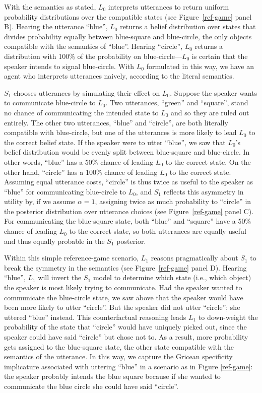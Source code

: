 \documentclass[10pt,letterpaper]{article}
\begin{document}
With the semantics as stated, $L_0$ interprets utterances to return uniform probability distributions over the compatible states (see Figure~\ref{ref-game} panel B). Hearing the utterance ``blue'', $L_0$ returns a belief distribution over states that divides probability equally between blue-square and blue-circle, the only objects compatible with the semantics of ``blue''. Hearing ``circle'', $L_0$ returns a distribution with 100\% of the probability on blue-circle---$L_0$ is certain that the speaker intends to signal blue-circle. With $L_0$ formulated in this way, we have an agent who interprets utterances naively, according to the literal semantics.

$S_1$ chooses utterances by simulating their effect on $L_0$. Suppose the speaker wants to communicate blue-circle to $L_0$. Two utterances, ``green'' and ``square'', stand no chance of communicating the intended state to $L_0$ and so they are ruled out entirely. The other two utterances, ``blue'' and ``circle'', are both literally compatible with blue-circle, but one of the utterances is more likely to lead $L_0$ to the correct belief state. If the speaker were to utter ``blue'', we saw that $L_0$'s belief distribution would be evenly split between blue-square and blue-circle. In other words, ``blue'' has a 50\% chance of leading $L_0$ to the correct state. On the other hand, ``circle'' has a 100\% chance of leading $L_0$ to the correct state. Assuming equal utterance costs, ``circle'' is thus twice as useful to the speaker as ``blue'' for communicating blue-circle to $L_0$, and $S_1$ reflects this asymmetry in utility by, if we assume $\alpha=1$, assigning twice as much probability to ``circle'' in the posterior distribution over utterance choices (see Figure~\ref{ref-game} panel C). For communicating the blue-square state, both ``blue'' and ``square'' have a 50\% chance of leading $L_0$ to the correct state, so both utterances are equally useful and thus equally probable in the $S_1$ posterior.

Within this simple reference-game scenario, $L_1$ reasons pragmatically about $S_1$ to break the symmetry in the semantics (see Figure~\ref{ref-game} panel D). Hearing ``blue'', $L_1$ will invert the $S_1$ model to determine which state (i.e., which object) the speaker is most likely trying to communicate. Had the speaker wanted to communicate the blue-circle state, we saw above that the speaker would have been more likely to utter ``circle''. But the speaker did not utter ``circle''; she uttered ``blue'' instead. This counterfactual reasoning leads $L_1$ to down-weight the probability of the state that ``circle'' would have uniquely picked out, since the speaker could have said ``circle'' but chose not to. As a result, more probability gets assigned to the blue-square state, the other state compatible with the semantics of the utterance. In this way, we capture the Gricean specificity implicature associated with uttering ``blue'' in a scenario as in Figure \ref{ref-game}: the speaker probably intends the blue square because if she wanted to communicate the blue circle she could have said ``circle''.
\end{document}
